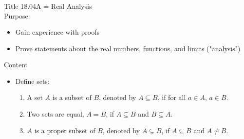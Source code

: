 \documentclass{beamer}
\begin{document}
\begin{frame}
    \frametitle{}
    \begin{block}{Title}
        18.04A = Real Analysis \\
        Purpose: 
        \begin{itemize}
            \item Gain experience with proofs
            \item Prove statements about the real numbers, functions, and limits ("analysis")
        \end{itemize}
    \end{block}
    \begin{block}{Content}
        \begin{itemize}
            \item Define sets:
                \begin{enumerate}
                    \item A set $A$ is a subset of $B$, denoted by $A \subseteq B$, if for all $a \in A$, $a \in B$.
                    \item Two sets are equal, $A = B$, if $A \subseteq B$ and $B \subseteq A$.
                    \item $A$ is a proper subset of $B$, denoted by $A \subsetneq B$, if $A \subseteq B$ and $A \neq B$.
                \end{enumerate}
        \end{itemize}
    \end{block}
\end{frame}
\end{document}
